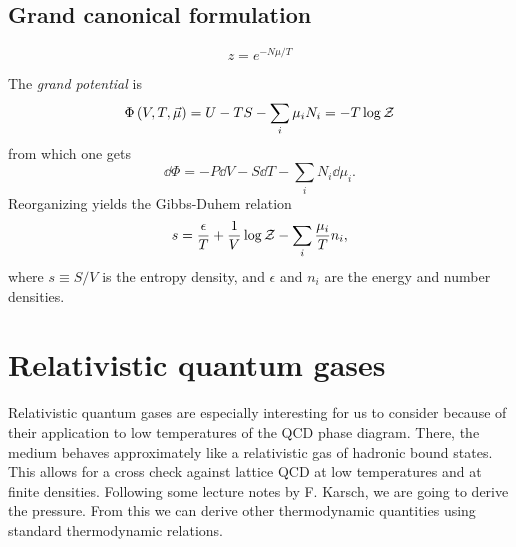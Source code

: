 \subsection{Grand canonical formulation}

\begin{equation}
  z=e^{-N\mu/T}
\end{equation}

The {\it grand potential} is
\begin{equation}\label{eq:grand}
  \Phi\left(V,T,\vec{\mu}\right)=U-TS-\sum_i\mu_i N_i=-T\log\mathcal{Z}
\end{equation}
from which one gets
\begin{equation}
  \dd\Phi=-P\dd V-S\dd T-\sum_i N_i\dd\mu_i.
\end{equation}
Reorganizing  yields the Gibbs-Duhem relation
\begin{equation}
  s=\frac{\epsilon}{T}+\frac{1}{V}\log\mathcal{Z}-\sum_i\frac{\mu_i}{T}n_i,
\end{equation}
where $s\equiv S/V$ is the entropy density, and $\epsilon$ and $n_i$
are the energy and number densities.

\section{Relativistic quantum gases}

Relativistic quantum gases are especially interesting for us
to consider because of their
application to low temperatures of the QCD phase diagram. There, the medium
behaves approximately like a relativistic gas of hadronic bound states.
This allows for a cross check against lattice QCD at low temperatures
and at finite densities. Following some lecture notes by F. Karsch,
we are going to derive the
pressure. From this we can derive other thermodynamic quantities
using standard thermodynamic relations.

